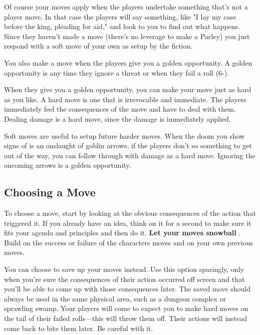        

Of course your moves apply when the players undertake something that's not a player move. In that case the players will say something, like "I lay my case before the king, pleading for aid," and look to you to find out what happens. Since they haven't made a move (there's no leverage to make a Parley) you just respond with a soft move of your own as setup by the fiction.

       

You also make a move when the players give you a golden opportunity. A golden opportunity is any time they ignore a threat or when they fail a roll (6-).

       

When they give you a golden opportunity, you can make your move just as hard as you like. A hard move is one that is irrevocable and immediate. The players immediately feel the consequences of the move and have to deal with them. Dealing damage is a hard move, since the damage is immediately applied.

       

Soft moves are useful to setup future harder moves. When the doom you show signs of is an onslaught of goblin arrows, if the players don't so something to get out of the way, you can follow through with damage as a hard move. Ignoring the oncoming arrows is a golden opportunity.

       
\subsection{Choosing a Move}   
       

To choose a move, start by looking at the obvious consequences of the action that triggered it. If you already have an idea, think on it for a second to make sure it fits your agenda and principles and then do it. {\bf Let your moves snowball} . Build on the success or failure of the characters moves and on your own previous moves.

       

You can choose to save up your moves instead. Use this option sparingly, only when you're sure the consequences of their action occurred off screen and that you'll be able to come up with those consequences later. The saved move should always be used in the same physical area, such as a dungeon complex or sprawling swamp. Your players will come to expect you to make hard moves on the tail of their failed rolls—this will throw them off. Their actions will instead come back to bite them later. Be careful with it.

